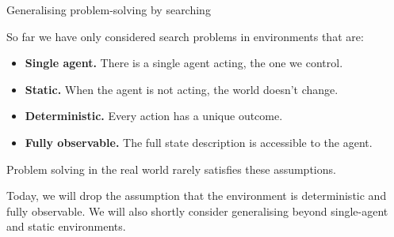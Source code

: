\documentclass[aspectratio=169,hyperref={pdfpagelabels=false}]{beamer}
\begin{document}
\begin{frame}{Generalising problem-solving by searching}

So far we have only considered search problems in environments that are:
\begin{itemize}
    \item \textbf{Single agent.} There is a single agent acting, the one we control.
    \item \textbf{Static.} When the agent is not acting, the world doesn't change.
    \item \textbf{Deterministic.} Every action has a unique outcome.
    \item \textbf{Fully observable.} The full state description is accessible to the agent.
\end{itemize}
Problem solving in the real world rarely satisfies these assumptions.

Today, we will drop the assumption that the environment is deterministic and fully observable. We will also shortly consider generalising beyond single-agent and static environments.

\end{frame}
\end{document}
